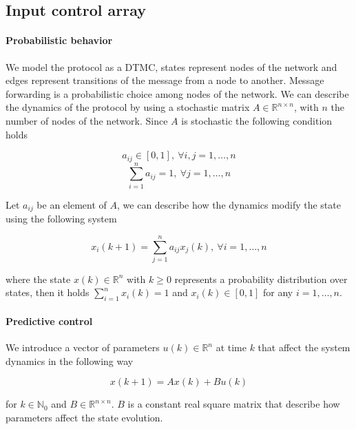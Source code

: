 \documentclass[a4paper, 11pt]{article}
\theoremstyle{definition}
\theoremstyle{remark}
\begin{document}

\subsection{Input control array} \label{subs:inputcontrol}

\paragraph{Probabilistic behavior}
We model the protocol as a DTMC, states represent nodes of the network and edges represent transitions of the message from a node to another. Message forwarding is a probabilistic choice among nodes of the network. We can describe the dynamics of the protocol by using a stochastic matrix $A \in \mathbb{R}^{n\times n}$, with $n$ the number of nodes of the network. Since $A$ is stochastic the following condition holds

\begin{equation} \label{eq:stoc1}
a_{ij} \in [0,1],\ \forall i,j = 1,\dots,n
\end{equation}
\begin{equation} \label{eq:stoc2}
\sum_{i=1}^n a_{ij} = 1,\ \forall j = 1,\dots,n
\end{equation}

Let $a_{ij}$ be an element of $A$, we can describe how the dynamics modify the state using the following system

\begin{equation} \label{eq:system}
	x_i(k+1) = \sum_{j=1}^n a_{ij} x_j(k), \ \forall i = 1,\dots,n
\end{equation}

where the state $x(k) \in \mathbb{R}^n$ with $k \geq 0$ represents a probability distribution over states, then it holds $\sum_{i=1}^n x_i(k) = 1$ and $x_i(k) \in [0,1]$ for any $i = 1,\dots,n$.

\paragraph{Predictive control} %
\label{par:predictive_control}
We introduce a vector of parameters $u(k) \in \mathbb{R}^n$ at time $k$ that affect the system dynamics in the following way

\begin{equation} \label{eq:mpc}
		x(k+1) = Ax(k) + Bu(k)
\end{equation}

for $k \in \mathbb{N}_0$ and $B \in \mathbb{R}^{n\times n}$. $B$ is a constant real square matrix that describe how parameters affect the state evolution.
\end{document}
